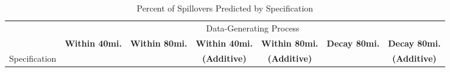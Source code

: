 \documentclass[aspectratio=169]{beamer}
\begin{document}
\begin{frame}
    \begin{table}[!tb]
        \caption{Percent of Spillovers Predicted by Specification}
        \label{tab:misspecification_mspe}
    
        \begin{adjustbox}{width = 1.1\textwidth, center}
            \begin{threeparttable}
                \begin{tabular}{@{} l rrrrrr @{}}
                    \toprule
                    & \multicolumn{6}{c}{Data-Generating Process} \\
                    \cmidrule{2-7}
    
                    & \multicolumn{1}{c}{\textbf{Within 40mi.}} & \multicolumn{1}{c}{\textbf{Within 80mi.}} & \multicolumn{1}{c}{\textbf{Within 40mi.}} & \multicolumn{1}{c}{\textbf{Within 80mi.}} & \multicolumn{1}{c}{\textbf{Decay 80mi.}} & \multicolumn{1}{c}{\textbf{Decay 80mi.}} \\
                    Specification & & & \multicolumn{1}{c}{\textbf{(Additive)}} & \multicolumn{1}{c}{\textbf{(Additive)}} & & \multicolumn{1}{c}{\textbf{(Additive)}} \\
    
     
                    \midrule
                    

\end{tabular}
\end{threeparttable}
\end{adjustbox}
\end{table}
\end{frame}
\end{document}
